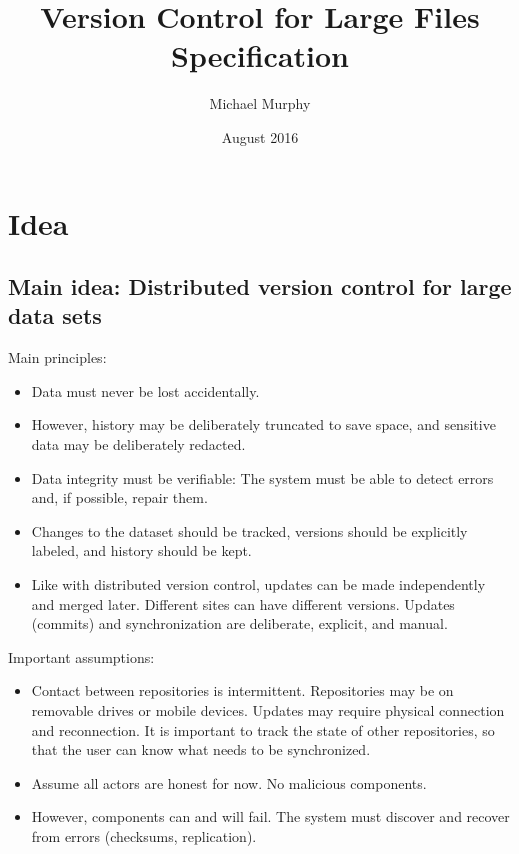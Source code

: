 \documentclass[a4paper]{article}
\begin{document}
\title{Version Control for Large Files\\
    Specification}
\author{Michael Murphy}
\date{August 2016}
\maketitle

\section{Idea}\label{idea}

\subsection{Main idea: Distributed version control for large data
sets}\label{main-idea-distributed-version-control-for-large-data-sets}

Main principles:

\begin{itemize}
\item
  Data must never be lost accidentally.
\item
  However, history may be deliberately truncated to save space, and
  sensitive data may be deliberately redacted.
\item
  Data integrity must be verifiable: The system must be able to detect
  errors and, if possible, repair them.
\item
  Changes to the dataset should be tracked, versions should be
  explicitly labeled, and history should be kept.
\item
  Like with distributed version control, updates can be made
  independently and merged later. Different sites can have different
  versions. Updates (commits) and synchronization are deliberate,
  explicit, and manual.
\end{itemize}

Important assumptions:

\begin{itemize}
\item
  Contact between repositories is intermittent. Repositories may be on
  removable drives or mobile devices. Updates may require physical
  connection and reconnection. It is important to track the state of
  other repositories, so that the user can know what needs to be
  synchronized.
\item
  Assume all actors are honest for now. No malicious components.
\item
  However, components can and will fail. The system must discover and
  recover from errors (checksums, replication).
\end{itemize}
\end{document}
